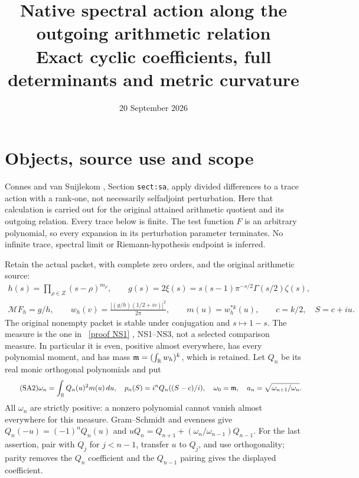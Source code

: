 \documentclass[11pt]{article}
\title{Native spectral action along the outgoing arithmetic relation\\
Exact cyclic coefficients, full determinants and metric curvature}
\author{}\date{20 September 2026}
\begin{document}
\maketitle

\section{Objects, source use and scope}

Connes and van Suijlekom \cite{CV}, Section \texttt{sect:sa},
apply divided differences to a trace action with a rank-one,
not necessarily selfadjoint perturbation. Here that calculation
is carried out for the original attained arithmetic quotient
and its outgoing relation. Every trace below is finite.
The test function $F$ is an arbitrary polynomial, so every
expansion in its perturbation parameter terminates. No
infinite trace, spectral limit or Riemann-hypothesis endpoint
is inferred.

Retain the actual packet, with complete zero orders, and
the original arithmetic source:
\begin{equation}\tag{SA1}\label{SA1}
\begin{gathered}
h(s)=\prod_{\rho\in Z}(s-\rho)^{m_\rho},\qquad
g(s)=2\xi(s)=s(s-1)\pi^{-s/2}\Gamma(s/2)\zeta(s),\\
\mathcal MF_h=g/h,\qquad
w_h(v)=\frac{|(g/h)(1/2+iv)|^2}{2\pi},\qquad
m(u)=w_h^{*k}(u),\qquad c=k/2,\quad S=c+iu.
\end{gathered}
\end{equation}
The original nonempty packet is stable under conjugation
and $s\mapsto1-s$. The measure is the one in \cite{Native}%
~\href{https://github.com/KokunoYumeto/zeta-function-research-reader/blob/5992ad50c0f2a06921f1fcaded7b4e38097c0739/workbenches/splitzero-tandem/continuations/20260920-original-kernel-mixed-determinants/providers/NATIVE_SECULAR_RECEIVER.tex\#L31}{[proof NS1]}%
{},
NS1--NS3, not a selected comparison measure. In particular
it is even, positive almost everywhere, has every polynomial
moment, and has mass
$\mathfrak m=(\int_\mathbb R w_h)^k$, which is retained.
Let $Q_n$ be its real monic orthogonal polynomials and put
\begin{equation}\tag{SA2}\label{SA2}
\omega_n=\int_\mathbb R Q_n(u)^2m(u)\,du,\quad
p_n(S)=i^nQ_n((S-c)/i),\quad
\omega_0=\mathfrak m,\quad
a_n=\sqrt{\omega_{n+1}/\omega_n}.
\end{equation}
All $\omega_n$ are strictly positive: a nonzero polynomial
cannot vanish almost everywhere for this measure.
Gram--Schmidt and evenness give
$Q_n(-u)=(-1)^nQ_n(u)$ and
$uQ_n=Q_{n+1}+(\omega_n/\omega_{n-1})Q_{n-1}$.
For the last assertion, pair with $Q_j$ for $j<n-1$,
transfer $u$ to $Q_j$, and use orthogonality; parity removes
the $Q_n$ coefficient and the $Q_{n-1}$ pairing gives
the displayed coefficient.
\end{document}
